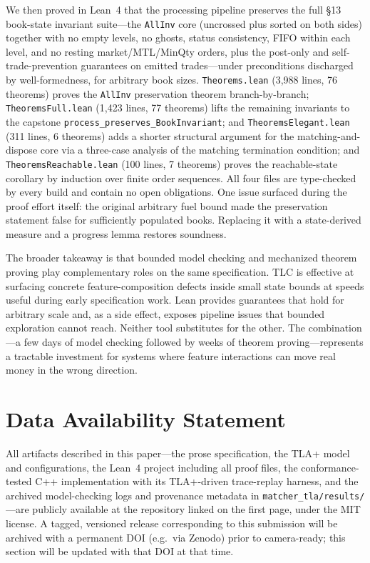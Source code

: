 \documentclass[11pt,a4paper]{article}
\begin{document}
We then proved in Lean~4 that the processing pipeline preserves the full
\S13 book-state invariant suite---the \texttt{AllInv} core (uncrossed
plus sorted on both sides) together with no empty levels, no ghosts,
status consistency, FIFO within each level, and no resting
market/MTL/MinQty orders, plus the post-only and self-trade-prevention
guarantees on emitted trades---under preconditions discharged by
well-formedness, for arbitrary book sizes. \texttt{Theorems.lean}
(3{,}988 lines, 76 theorems) proves the \texttt{AllInv} preservation
theorem branch-by-branch; \texttt{TheoremsFull.lean} (1{,}423 lines,
77 theorems) lifts the remaining invariants to the capstone
\texttt{process\_preserves\_BookInvariant}; and
\texttt{TheoremsElegant.lean} (311 lines, 6 theorems) adds a shorter
structural argument for the matching-and-dispose core via a three-case
analysis of the matching termination condition; and
\texttt{TheoremsReachable.lean} (100 lines, 7 theorems) proves the
reachable-state corollary by induction over finite order sequences. All
four files are
type-checked by every build and contain no open obligations. One issue
surfaced during the proof effort itself: the original arbitrary fuel
bound made the preservation statement false for sufficiently populated
books. Replacing it with a state-derived measure and a progress lemma
restores soundness.

The broader takeaway is that bounded model checking and mechanized
theorem proving play complementary roles on the same specification. TLC
is effective at surfacing concrete feature-composition defects inside
small state bounds at speeds useful during early specification work.
Lean provides guarantees that hold for arbitrary scale and, as a side
effect, exposes pipeline issues that bounded exploration cannot reach.
Neither tool substitutes for the other. The combination---a few days of
model checking followed by weeks of theorem proving---represents a
tractable investment for systems where feature interactions can move
real money in the wrong direction.

\section*{Data Availability Statement}

All artifacts described in this paper---the prose specification, the
TLA+ model and configurations, the Lean~4 project including all proof
files, the conformance-tested C++ implementation with its TLA+-driven
trace-replay harness, and the archived model-checking logs and
provenance metadata in \texttt{matcher\_tla/results/}---are publicly
available at the repository linked on the first page, under the MIT
license. A tagged, versioned release corresponding to this submission
will be archived with a permanent DOI (e.g.\ via Zenodo) prior to
camera-ready; this section will be updated with that DOI at that time.
\end{document}
